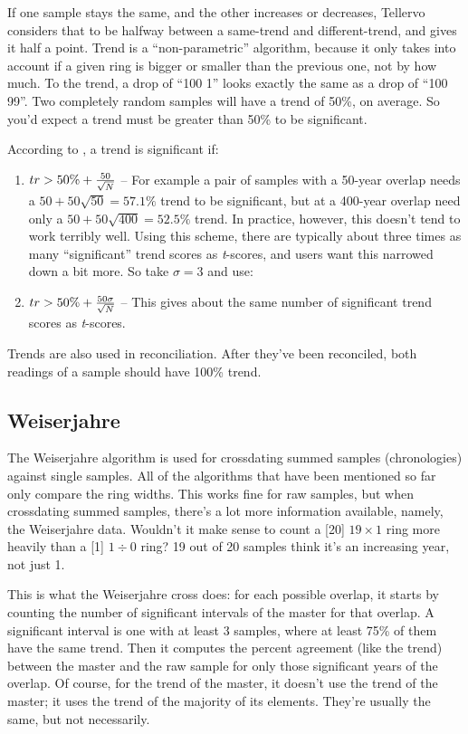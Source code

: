 If one sample stays the same, and the other increases or decreases, Tellervo considers that to be halfway between a same-trend and different-trend, and gives it half a point. Trend is a ``non-parametric'' algorithm, because it only takes into account if a given ring is bigger or smaller than the previous one, not by how much. To the trend, a drop of ``100 1'' looks exactly the same as a drop of ``100 99''. Two completely random samples will have a trend of 50\%, on average. So you'd expect a trend must be greater than 50\% to be significant.

According to \citet{Huber70}, a trend is significant if:

\begin{enumerate}
  \item \textbf{$tr > 50\% + {50 \over \sqrt{N}}$} -- For example a pair of samples with a 50-year overlap needs a $50+50\sqrt{50} = 57.1\%$ trend to be significant, but at a 400-year overlap need only a $50 + 50\sqrt{400} = 52.5\%$ trend. In practice, however, this doesn't tend to work terribly well. Using this scheme, there are typically about three times as many ``significant'' trend scores as \textit{t}-scores, and users want this narrowed down a bit more. So take $\sigma=3$ and use:
  \item $tr > 50\% + {50\sigma \over \sqrt{N}}$ -- This gives about the same number of significant trend scores as \textit{t}-scores. 

\end{enumerate}

Trends are also used in reconciliation. After they've been reconciled, both readings of a sample should have 100\% trend. 

\subsection{Weiserjahre}
The Weiserjahre algorithm is used for crossdating summed samples (chronologies) against single samples. All of the algorithms that have been mentioned so far only compare the ring widths. This works fine for raw samples, but when crossdating summed samples, there's a lot more information available, namely, the Weiserjahre data. Wouldn't it make sense to count a [20] $19\times1$ ring more heavily than a [1] $1\div0$ ring? 19 out of 20 samples think it's an increasing year, not just 1. 

This is what the Weiserjahre cross does: for each possible overlap, it starts by counting the number of significant intervals of the master for that overlap. A significant interval is one with at least 3 samples, where at least 75\% of them have the same trend. Then it computes the percent agreement (like the trend) between the master and the raw sample for only those significant years of the overlap. Of course, for the trend of the master, it doesn't use the trend of the master; it uses the trend of the majority of its elements. They're usually the same, but not necessarily.


